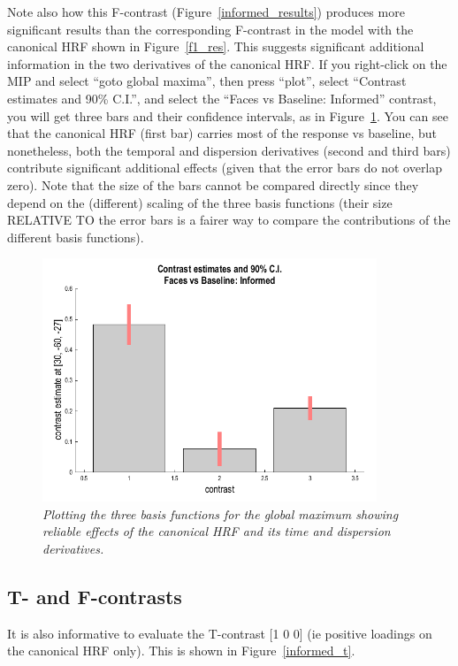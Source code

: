 \documentclass[a4paper,titlepage]{book}
\begin{document}
Note also how this F-contrast (Figure~\ref{informed_results}) produces more significant results than the corresponding F-contrast in the model with the canonical HRF shown in Figure~\ref{f1_res}. This suggests significant additional information in the two derivatives of the canonical HRF. If you right-click on the MIP and select ``goto global maxima'', then press ``plot'', select ``Contrast estimates and 90\% C.I.'', and select the ``Faces vs Baseline: Informed'' contrast, you will get three bars and their confidence intervals, as in Figure~\ref{informed_plot}. You can see that the canonical HRF (first bar) carries most of the response vs baseline, but nonetheless, both the temporal and dispersion derivatives (second and third bars) contribute significant additional effects (given that the error bars do not overlap zero). Note that the size of the bars cannot be compared directly since they depend on the (different) scaling of the three basis functions (their size RELATIVE TO the error bars is a fairer way to compare the contributions of the different basis functions).

\begin{figure}
\begin{center}
\includegraphics[width=100mm]{faces_group/informed_plot}
\caption{\em Plotting the three basis functions for the global maximum showing reliable effects of the canonical HRF and its time and dispersion derivatives. \label{informed_plot}}
\end{center}
\end{figure}

\subsection{T- and F-contrasts}

It is also informative to evaluate the T-contrast [1 0 0] (ie positive loadings on the canonical HRF only). This is shown in Figure~\ref{informed_t}.
\end{document}
